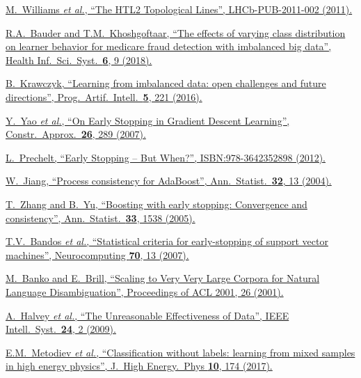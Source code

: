 \href{http://inspirehep.net/record/928798}{M.~Williams \textit{et al.}, \enquote{The HTL2 Topological Lines}, LHCb-PUB-2011-002 (2011).}

\href{https://doi.org/10.1007/s13755-018-0051-3}{R.A.~Bauder and T.M.~Khoshgoftaar, \enquote{The effects of varying class distribution on learner behavior for medicare fraud detection with imbalanced big data}, Health Inf.\ Sci.\ Syst.~\textbf{6}, 9 (2018).}

\href{https://doi.org/10.1007/s13748-016-0094-0}{B.~Krawczyk, \enquote{Learning from imbalanced data: open challenges and future directions}, Prog.\ Artif.\ Intell.\ \textbf{5}, 221 (2016).}

\href{https://doi.org/10.1007/s00365-006-0663-2}{Y.~Yao \textit{et al.}, \enquote{On Early Stopping in Gradient Descent Learning}, Constr.\ Approx.\ \textbf{26}, 289 (2007).}

\href{https://doi.org/10.1007/978-3-642-35289-8_5}{L.~Prechelt, \enquote{Early Stopping -- But When?}, ISBN:978-3642352898 (2012).}

\href{https://doi.org/10.1214/aos/1079120128}{W.~Jiang, \enquote{Process consistency for AdaBoost}, Ann.\ Statist.\ \textbf{32}, 13 (2004).}

\href{https://doi.org/10.1214/009053605000000255}{T.~Zhang and B.~Yu, \enquote{Boosting with early stopping: Convergence and consistency}, Ann.\ Statist.\ \textbf{33}, 1538 (2005).}

\href{https://doi.org/10.1016/j.neucom.2006.12.019}{T.V.~Bandos \textit{et al.}, \enquote{Statistical criteria for early-stopping of support vector machines}, Neurocomputing \textbf{70}, 13 (2007).}

\href{https://doi.org/10.3115/1073012.1073017}{M.~Banko and E.~Brill, \enquote{Scaling to Very Very Large Corpora for Natural Language Disambiguation}, Proceedings of ACL 2001, 26 (2001).}

\href{https://doi.org/10.1109/MIS.2009.36}{A.~Halvey \textit{et al.}, \enquote{The Unreasonable Effectiveness of Data}, IEEE Intell.\ Syst.\ \textbf{24}, 2 (2009).}

\href{https://doi.org/10.1007/JHEP10(2017)174}{E.M.~Metodiev \textit{et al.}, \enquote{Classification without labels: learning from mixed samples in high energy physics}, J.\ High Energy.\ Phys \textbf{10}, 174 (2017).}

